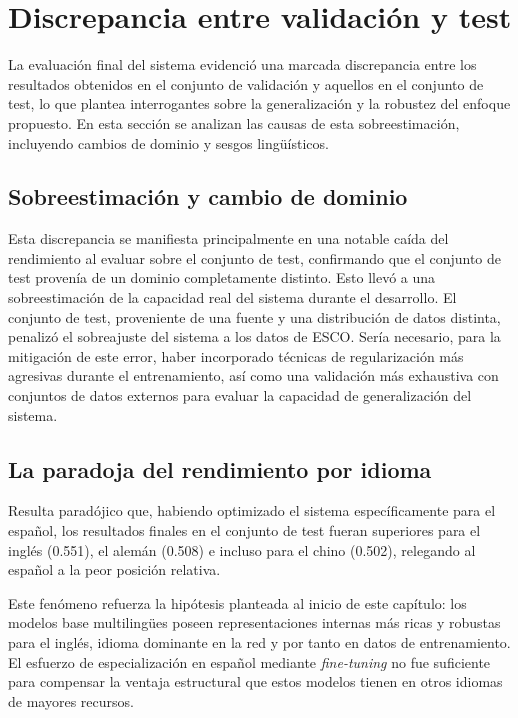 \section{Discrepancia entre validación y test}

\noindent La evaluación final del sistema evidenció una marcada discrepancia entre los resultados obtenidos en el conjunto de validación y aquellos en el conjunto de test, lo que plantea interrogantes sobre la generalización y la robustez del enfoque propuesto. En esta sección se analizan las causas de esta sobreestimación, incluyendo cambios de dominio y sesgos lingüísticos.

\subsection{Sobreestimación y cambio de dominio}
\noindent Esta discrepancia se manifiesta principalmente en una notable caída del rendimiento al evaluar sobre el conjunto de test, confirmando que el conjunto de test provenía de un dominio completamente distinto. Esto llevó a una sobreestimación de la capacidad real del sistema durante el desarrollo. El conjunto de test, proveniente de una fuente y una distribución de datos distinta, penalizó el sobreajuste del sistema a los datos de \gls{ESCO}. Sería necesario, para la mitigación de este error, haber incorporado técnicas de regularización más agresivas durante el entrenamiento, así como una validación más exhaustiva con conjuntos de datos externos para evaluar la capacidad de generalización del sistema.

\subsection{La paradoja del rendimiento por idioma}
\noindent Resulta paradójico que, habiendo optimizado el sistema específicamente para el español, los resultados finales en el conjunto de test fueran superiores para el inglés (0.551), el alemán (0.508) e incluso para el chino (0.502), relegando al español a la peor posición relativa.

Este fenómeno refuerza la hipótesis planteada al inicio de este capítulo: los modelos base multilingües poseen representaciones internas más ricas y robustas para el inglés, idioma dominante en la red y por tanto en datos de entrenamiento. El esfuerzo de especialización en español mediante \textit{fine-tuning} no fue suficiente para compensar la ventaja estructural que estos modelos tienen en otros idiomas de mayores recursos.


